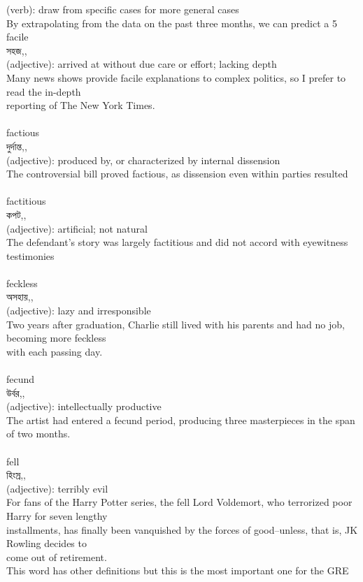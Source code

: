 \documentclass{article}
\begin{document}
{(verb): draw from specific cases for more general cases\\By extrapolating from the data on the past three months, we can predict a 5%
{facile}\\
{সহজ,,}\\
{(adjective): arrived at without due care or effort; lacking depth\\Many news shows provide facile explanations to complex politics, so I prefer to read the in-depth\\reporting of The New York Times.\\}\\
{factious}\\
{দুর্দান্ত,,}\\
{(adjective): produced by, or characterized by internal dissension\\The controversial bill proved factious, as dissension even within parties resulted\\}\\
{factitious}\\
{কপট,,}\\
{(adjective): artificial; not natural\\The defendant's story was largely factitious and did not accord with eyewitness testimonies\\}\\
{feckless}\\
{অসহায়,,}\\
{(adjective): lazy and irresponsible\\Two years after graduation, Charlie still lived with his parents and had no job, becoming more feckless\\with each passing day.\\}\\
{fecund}\\
{উর্বর,,}\\
{(adjective): intellectually productive\\The artist had entered a fecund period, producing three masterpieces in the span of two months.\\}\\
{fell}\\
{হিংস্র,,}\\
{(adjective): terribly evil\\For fans of the Harry Potter series, the fell Lord Voldemort, who terrorized poor Harry for seven lengthy\\installments, has finally been vanquished by the forces of good--unless, that is, JK Rowling decides to\\come out of retirement.\\This word has other definitions but this is the most important one for the GRE\\}\\
}
\end{document}
